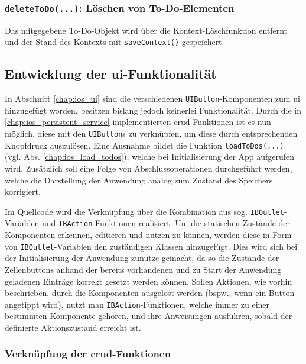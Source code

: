 \subsubsection{\texttt{deleteToDo(...)}: Löschen von To-Do-Elementen}
Das mitgegebene To-Do-Objekt wird über die Kontext-Löschfunktion entfernt und der Stand des Kontexts mit \texttt{saveContext()} gespeichert.

\subsection{Entwicklung der \ac{ui}-Funktionalität}
In Abschnitt \ref{chap:ios_ui} sind die verschiedenen \texttt{UIButton}-Komponenten zum \ac{ui} hinzugefügt worden, besitzen bislang jedoch keinerlei Funktionalität. Durch die in \ref{chap:ios_persistent_service} implementierten \ac{crud}-Funktionen ist es nun möglich, diese mit den \texttt{UIButton}s zu verknüpfen, um diese durch entsprechenden Knopfdruck auszulösen. Eine Ausnahme bildet die Funktion \texttt{loadToDos(...)} (vgl. Abs. \ref{chap:ios_load_todos}), welche bei Initialisierung der App aufgerufen wird. Zusätzlich soll eine Folge von Abschlussoperationen durchgeführt werden, welche die Darstellung der Anwendung analog zum Zustand des Speichers korrigiert.

Im Quellcode wird die Verknüpfung über die Kombination aus sog. \texttt{IBOutlet}-Variablen und \texttt{IBAction}-Funktionen realisiert. Um die statischen Zustände der Komponenten erkennen, editieren und nutzen zu können, werden diese in Form von \texttt{IBOutlet}-Variablen den zuständigen Klassen hinzugefügt. Dies wird sich bei der Initialisierung der Anwendung zunutze gemacht, da so die Zustände der Zellenbuttons anhand der bereits vorhandenen und zu Start der Anwendung geladenen Einträge korrekt gesetzt werden können. Sollen Aktionen, wie vorhin beschrieben, durch die Komponenten ausgelöst werden (bspw., wenn ein Button angetippt wird), nutzt man \texttt{IBAction}-Funktionen, welche immer zu einer bestimmten Komponente gehören, und ihre Anweisungen ausführen, sobald der definierte Aktionszustand erreicht ist.

\subsubsection{Verknüpfung der \ac{crud}-Funktionen}

